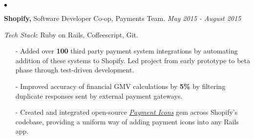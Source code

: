 \documentclass[11pt]{article}
\newenvironment{achievements}{\begin{list}{$\bullet$}{\topsep 0pt \itemsep -1.5pt \leftmargin 5pt}}{\vspace*{4pt}\end{list}}
\begin{document}
\begin{achievements}
\vspace{6pt}

\item \textbf{Shopify,} Software Developer Co-op, Payments Team. \hfill \textit {May 2015 - August 2015}

\vspace{1pt}
\item[ ] \textit{Tech Stack}: Ruby on Rails, Coffeescript, Git.
\vspace{3pt}

\begin{itemize}
\item[-]Added over \textbf{100} third party payment system integrations by automating addition of these systems to Shopify. Led project from early prototype to beta phase through test-driven development.
\vspace{3pt}
\item[-]Improved accuracy of financial GMV calculations by \textbf{5\%} by filtering duplicate responses sent by external payment gateways.
\vspace{3pt}
\item[-]Created and integrated open-source \textit{\href{https://github.com/activemerchant/payment_icons}{Payment Icons}} gem across Shopify's codebase, providing a uniform way of adding payment icons into any Rails app.
\end{itemize}
\end{achievements}

\vspace{6pt}
\end{document}
